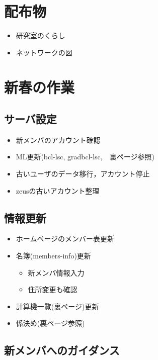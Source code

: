 \documentclass[twocolumn,11pt]{jsarticle}
\begin{document}

\setcounter{page}{1}


\section*{配布物}
\begin{itemize}
\item 研究室のくらし
\item ネットワークの図
\end{itemize}

\section{新春の作業}

\subsection{サーバ設定}
\begin{itemize}
\item 新メンバのアカウント確認
\item ML更新(bcl-lsc, gradbcl-lsc,　裏ページ参照)
\item 古いユーザのデータ移行，アカウント停止
\item zeusの古いアカウント整理
\end{itemize}

\subsection{情報更新}
\begin{itemize}
\item ホームページのメンバー表更新
\item 名簿(members-info)更新
  \begin{itemize}
  \item 新メンバ情報入力
  \item 住所変更も確認
  \end{itemize}
\item 計算機一覧(裏ページ)更新
\item 係決め(裏ページ参照)
\end{itemize}

\subsection{新メンバへのガイダンス}
\end{document}
